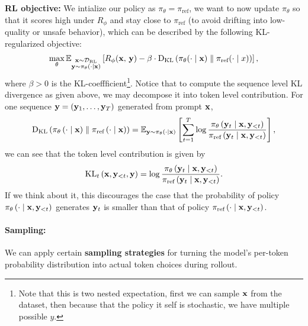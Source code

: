 \documentclass[11pt]{article}  %
\begin{document}
\textbf{RL objective:} We intialize our policy as $\pi_{\theta} = \pi_{\text{ref}}$, we want to now update $\pi_{\theta}$ so that it scores high under $R_{\phi}$ and stay close to $\pi_{\text{ref}}$ (to avoid drifting into low-quality or unsafe behavior), which can be described by the following KL-regularized objective:
\begin{align}
  \label{eq-obj-RL}
  \max_{\theta} \mathbb{E}_{\substack{\mathbf{x} \sim \mathcal{D}_{\text{RL}} \\ \mathbf{y} \sim \pi_{\theta}(\cdot \mid \mathbf{x})}}\left[R_{\phi}(\mathbf{x}, \,\mathbf{y}) - \beta \cdot {\rm D}_{\text{KL}}\left( \pi_{\theta}(\cdot \mid \mathbf{x}) \parallel \pi_{\text{ref}}(\cdot \mid x) \right)\right],
\end{align}
where $\beta > 0$ is the KL-coeffficient\footnote{Note that this is two nested expectation, first we can sample $\mathbf{x}$ from the dataset, then because that the policy it self is stochastic, we have multiple possible $y$.}.
Notice that to compute the sequence level KL divergence as given above, we may decompose it into token level contribution.
For one sequence $\mathbf{y} = \left( \mathbf{y}_1, \hdots, \mathbf{y}_T \right)$ generated from prompt $\mathbf{x}$,
\begin{align*}
  {\rm D}_{\text{KL}}\left( \pi_{\theta}\left( \cdot \mid \mathbf{x} \right) \parallel \pi_{\text{ref}}\left( \cdot \mid \mathbf{x} \right) \right) = \mathbb{E}_{\mathbf{y} \sim \pi_{\theta}\left( \cdot \mid \mathbf{x} \right)}\left[\sum_{t=1}^{T}\log \frac{\pi_{\theta}\left( \mathbf{y}_t \mid \mathbf{x}, \mathbf{y}_{<t} \right)}{\pi_{\text{ref}}\left( \mathbf{y}_t \mid \mathbf{x}, \mathbf{y}_{<t} \right)}\right],
\end{align*}
we can see that the token level contribution is given by 
\begin{align*}
  \text{KL}_t \left( \mathbf{x}, \mathbf{y}_{<t}, \mathbf{y} \right) = \log \frac{\pi_{\theta}\left( \mathbf{y}_t \mid \mathbf{x}, \mathbf{y}_{<t} \right)}{\pi_{\text{ref}}\left( \mathbf{y}_t \mid \mathbf{x}, \mathbf{y}_{<t} \right)}.
\end{align*}
If we think about it, this discourages the case that the probability of policy $\pi_{\theta}\left( \cdot \mid \mathbf{x}, \mathbf{y}_{<t} \right)$ generates $\mathbf{y}_t$ is smaller than that of policy $\pi_{\text{ref}}\left( \cdot \mid \mathbf{x}, \mathbf{y}_{<t} \right)$.

\paragraph{Sampling:} 
We can apply certain \textbf{sampling strategies} for turning the model's per-token probability distribution into actual token choices during rollout.
\end{document}
